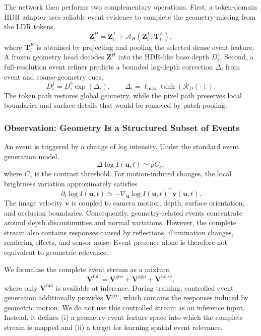 The network then performs two complementary operations. First, a
token-domain HDR adapter uses reliable event evidence to complete the geometry
missing from the LDR tokens,
\begin{equation}
    \bm Z_i^{H}=\bm Z_i^{L}
    +\mathcal A_H(\bm Z_i^{L},\bm T_i^E),
\end{equation}
where $\bm T_i^E$ is obtained by projecting and pooling the selected dense
event feature. A frozen geometry head decodes $\bm Z^H$ into the HDR-like base
depth $D_i^{b}$. Second, a full-resolution event refiner predicts a bounded
log-depth correction $\Delta_i$ from event and coarse-geometry cues,
\begin{equation}
    D_i^{f}=D_i^{b}\exp(\Delta_i),
    \qquad
    \Delta_i=\ell_{\max}\tanh(\mathcal R_D(\cdot)).
\end{equation}
The token path restores global geometry, while the pixel path preserves local
boundaries and surface details that would be removed by patch pooling.

\subsubsection{Observation: Geometry Is a Structured Subset of Events}
\label{sec:event_observation}

An event is triggered by a change of log intensity. Under the standard event
generation model,
\begin{equation}
    \Delta\log I(\bm u,t)\simeq pC_e,
\end{equation}
where $C_e$ is the contrast threshold. For motion-induced changes, the local
brightness variation approximately satisfies
\begin{equation}
    \partial_t\log I(\bm u,t)
    \simeq-\nabla_{\bm u}\log I(\bm u,t)^{\top}\bm v(\bm u,t).
\end{equation}
The image velocity $\bm v$ is coupled to camera motion, depth, surface
orientation, and occlusion boundaries. Consequently, geometry-related events
concentrate around depth discontinuities and normal variations. However, the
complete stream also contains responses caused by reflections, illumination
changes, rendering effects, and sensor noise. Event presence alone is
therefore not equivalent to geometric relevance.

We formalize the complete event stream as a mixture,
\begin{equation}
    \bm V^{\mathrm{full}}
    =\bm V^{\mathrm{geo}}+\bm V^{\mathrm{app}}+\bm V^{\mathrm{noise}},
\end{equation}
where only $\bm V^{\mathrm{full}}$ is available at inference. During training,
controlled event generation additionally provides
$\bm V^{\mathrm{geo}}$, which contains the responses induced by geometric
motion. We do not use this controlled stream as an inference input. Instead,
it defines (i) a geometry-event feature space into which the complete stream
is mapped and (ii) a target for learning spatial event relevance.

